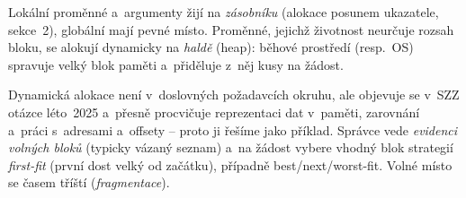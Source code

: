 Lokální proměnné a~argumenty žijí na \emph{zásobníku} (alokace posunem ukazatele, sekce~2), globální mají pevné místo. Proměnné, jejichž životnost neurčuje rozsah bloku, se alokují dynamicky na \emph{haldě} (heap): běhové prostředí (resp.\ OS) spravuje velký blok paměti a~přiděluje z~něj kusy na žádost.

\begin{intuice}
Dynamická alokace není v~doslovných požadavcích okruhu, ale objevuje se v~SZZ otázce léto~2025 a~přesně procvičuje reprezentaci dat v~paměti, zarovnání a~práci s~adresami a~offsety -- proto ji řešíme jako příklad. Správce vede \emph{evidenci volných bloků} (typicky vázaný seznam) a~na žádost vybere vhodný blok strategií \emph{first-fit} (první dost velký od začátku), případně best/next/worst-fit. Volné místo se časem tříští (\emph{fragmentace}).
\end{intuice}

